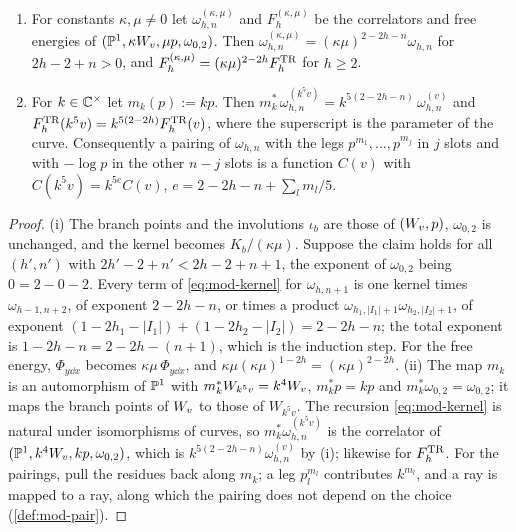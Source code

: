 \begin{lem}
\label{lem:mod-scale}
\begin{enumerate}
\item For constants $\kappa,\mu\neq 0$ let $\omega^{(\kappa,\mu)}_{h,n}$ and $F^{(\kappa,\mu)}_h$ be the correlators and free energies of $(\mathbb{P}^1,\kappa W_{v},\mu p,\omega_{0,2})$. Then $\omega^{(\kappa,\mu)}_{h,n}=(\kappa\mu)^{2-2h-n}\omega_{h,n}$ for $2h-2+n>0$, and $F^{(\kappa,\mu)}_h=(\kappa\mu)^{2-2h}F^{\mathrm{TR}}_h$ for $h\geq 2$.
\item For $k\in\mathbb{C}^\times$ let $m_k(p):=kp$. Then $m_k^*\,\omega^{(k^5v)}_{h,n}=k^{5(2-2h-n)}\,\omega^{(v)}_{h,n}$ and $F^{\mathrm{TR}}_h(k^5v)=k^{5(2-2h)}F^{\mathrm{TR}}_h(v)$, where the superscript is the parameter of the curve. Consequently a pairing of $\omega_{h,n}$ with the legs $p^{m_1},\dots,p^{m_j}$ in $j$ slots and with $-\log p$ in the other $n-j$ slots is a function $C(v)$ with $C(k^5v)=k^{5e}C(v)$, $e=2-2h-n+\sum_lm_l/5$.
\end{enumerate}
\end{lem}

\begin{proof}
(i) The branch points and the involutions $\iota_b$ are those of $(W_{v},p)$, $\omega_{0,2}$ is unchanged, and the kernel becomes $K_b/(\kappa\mu)$. Suppose the claim holds for all $(h',n')$ with $2h'-2+n'<2h-2+n+1$, the exponent of $\omega_{0,2}$ being $0=2-0-2$. Every term of \eqref{eq:mod-kernel} for $\omega_{h,n+1}$ is one kernel times $\omega_{h-1,n+2}$, of exponent $2-2h-n$, or times a product $\omega_{h_1,|I_1|+1}\omega_{h_2,|I_2|+1}$, of exponent $(1-2h_1-|I_1|)+(1-2h_2-|I_2|)=2-2h-n$; the total exponent is $1-2h-n=2-2h-(n+1)$, which is the induction step. For the free energy, $\Phi_{y\dd x}$ becomes $\kappa\mu\,\Phi_{y\dd x}$, and $\kappa\mu(\kappa\mu)^{1-2h}=(\kappa\mu)^{2-2h}$. (ii) The map $m_k$ is an automorphism of $\mathbb{P}^1$ with $m_k^*W_{k^5v}=k^4W_{v}$, $m_k^*p=kp$ and $m_k^*\omega_{0,2}=\omega_{0,2}$; it maps the branch points of $W_{v}$ to those of $W_{k^5v}$. The recursion \eqref{eq:mod-kernel} is natural under isomorphisms of curves, so $m_k^*\omega^{(k^5v)}_{h,n}$ is the correlator of $(\mathbb{P}^1,k^4W_{v},kp,\omega_{0,2})$, which is $k^{5(2-2h-n)}\omega^{(v)}_{h,n}$ by (i); likewise for $F^{\mathrm{TR}}_h$. For the pairings, pull the residues back along $m_k$; a leg $p_l^{m_l}$ contributes $k^{m_l}$, and a ray is mapped to a ray, along which the pairing does not depend on the choice (\cref{def:mod-pair}).
\end{proof}

